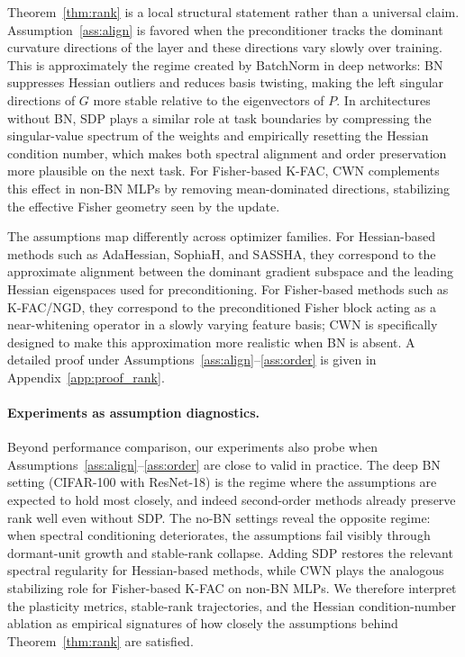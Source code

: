 \begin{remark}
\label{rem:rank_assumptions_empirical}
Theorem~\ref{thm:rank} is a local structural statement rather than a universal claim. Assumption~\ref{ass:align} is favored when the preconditioner tracks the dominant curvature directions of the layer and these directions vary slowly over training. This is approximately the regime created by BatchNorm in deep networks: BN suppresses Hessian outliers and reduces basis twisting, making the left singular directions of $G$ more stable relative to the eigenvectors of $P$. In architectures without BN, SDP plays a similar role at task boundaries by compressing the singular-value spectrum of the weights and empirically resetting the Hessian condition number, which makes both spectral alignment and order preservation more plausible on the next task. For Fisher-based K-FAC, CWN complements this effect in non-BN MLPs by removing mean-dominated directions, stabilizing the effective Fisher geometry seen by the update.

The assumptions map differently across optimizer families. For Hessian-based methods such as AdaHessian, SophiaH, and SASSHA, they correspond to the approximate alignment between the dominant gradient subspace and the leading Hessian eigenspaces used for preconditioning. For Fisher-based methods such as K-FAC/NGD, they correspond to the preconditioned Fisher block acting as a near-whitening operator in a slowly varying feature basis; CWN is specifically designed to make this approximation more realistic when BN is absent. A detailed proof under Assumptions~\ref{ass:align}--\ref{ass:order} is given in Appendix~\ref{app:proof_rank}.
\end{remark}

\paragraph{Experiments as assumption diagnostics.}
Beyond performance comparison, our experiments also probe when Assumptions~\ref{ass:align}--\ref{ass:order} are close to valid in practice. The deep BN setting (CIFAR-100 with ResNet-18) is the regime where the assumptions are expected to hold most closely, and indeed second-order methods already preserve rank well even without SDP. The no-BN settings reveal the opposite regime: when spectral conditioning deteriorates, the assumptions fail visibly through dormant-unit growth and stable-rank collapse. Adding SDP restores the relevant spectral regularity for Hessian-based methods, while CWN plays the analogous stabilizing role for Fisher-based K-FAC on non-BN MLPs. We therefore interpret the plasticity metrics, stable-rank trajectories, and the Hessian condition-number ablation as empirical signatures of how closely the assumptions behind Theorem~\ref{thm:rank} are satisfied.
